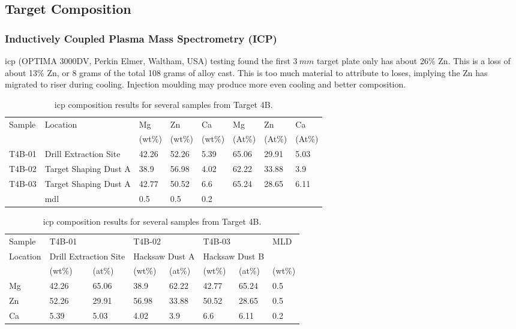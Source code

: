 \documentclass[a4paper,12pt,oneside]{report}%
\begin{document}
\subsection{Target Composition}

\subsubsection{Inductively Coupled Plasma Mass Spectrometry (ICP)}
\Gls{icp} (OPTIMA 3000DV, Perkin Elmer, Waltham, USA) testing found the first $3~ mm$ target plate only has about 26\% Zn. This is a loss of about 13\% Zn, or 8 grams of the total 108 grams of alloy cast.  This is too much material to attribute to loses, implying the Zn has migrated to riser during cooling. Injection moulding may produce more even cooling and better composition. 

\begin{table}[H]
	\centering
	\begin{tabular}{l l l l l l l l}
		\toprule
		Sample & Location & Mg & Zn & Ca & Mg & Zn & Ca \\ 
		& & (wt\%) & (wt\%) & (wt\%) & (At\%) & (At\%) & (At\%) \\ 
		\midrule
		T4B-01 & Drill Extraction Site & 42.26 & 52.26 & 5.39 & 65.06 & 29.91 & 5.03 \\ 
		T4B-02 & Target Shaping Dust A & 38.9 & 56.98 & 4.02 & 62.22 & 33.88 & 3.9 \\
		T4B-03 & Target Shaping Dust A & 42.77 & 50.52 & 6.6 & 65.24 & 28.65 & 6.11 \\
		\midrule
		& \acrshort{mdl} & 0.5 & 0.5 & 0.2 &  &  &  \\
		\bottomrule
	\end{tabular}
	\caption{\acrshort{icp} composition results for several samples from Target 4B.}
	\label{tab:ICPT4B}
\end{table}

\begin{table}[H]
	\centering
	\begin{tabular}{ l l l l l l l l }
		\toprule
		Sample & \multicolumn{2}{l}{T4B-01} & \multicolumn{2}{l}{T4B-02} & \multicolumn{2}{l}{T4B-03} & MLD \\
		Location & \multicolumn{2}{l}{Drill Extraction Site} & \multicolumn{2}{l}{Hacksaw Dust A} & \multicolumn{2}{l}{Hacksaw Dust B}  &  \\
		& (wt\%) & (at\%) & (wt\%) & (at\%) & (wt\%) & (at\%) & (wt\%) \\
		\midrule
		Mg & 42.26 & 65.06 & 38.9 & 62.22 & 42.77 & 65.24 & 0.5 \\
		Zn & 52.26 & 29.91 & 56.98 & 33.88 & 50.52 & 28.65 & 0.5 \\
		Ca & 5.39 & 5.03 & 4.02 & 3.9 & 6.6 & 6.11 & 0.2 \\
		\bottomrule
	\end{tabular}
	\caption{\acrshort{icp} composition results for several samples from Target 4B.}
	\label{tab:ICPT4B_V2}
\end{table}
\end{document}

